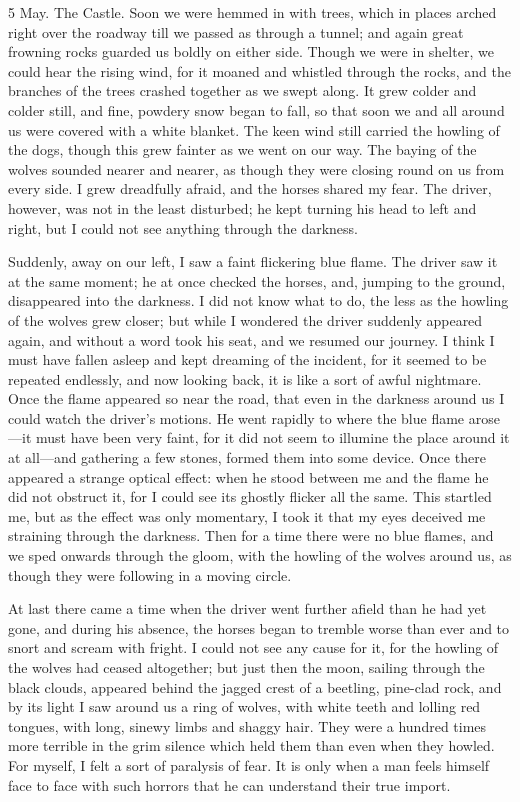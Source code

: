 \begin{diary}{5 May. The Castle.}
Soon we were hemmed in with trees, which in places arched right over the roadway till we passed as through a tunnel; and again great frowning rocks guarded us boldly on either side. Though we were in shelter, we could hear the rising wind, for it moaned and whistled through the rocks, and the branches of the trees crashed together as we swept along. It grew colder and colder still, and fine, powdery snow began to fall, so that soon we and all around us were covered with a white blanket. The keen wind still carried the howling of the dogs, though this grew fainter as we went on our way. The baying of the wolves sounded nearer and nearer, as though they were closing round on us from every side. I grew dreadfully afraid, and the horses shared my fear. The driver, however, was not in the least disturbed; he kept turning his head to left and right, but I could not see anything through the darkness.

Suddenly, away on our left, I saw a faint flickering blue flame. The driver saw it at the same moment; he at once checked the horses, and, jumping to the ground, disappeared into the darkness. I did not know what to do, the less as the howling of the wolves grew closer; but while I wondered the driver suddenly appeared again, and without a word took his seat, and we resumed our journey. I think I must have fallen asleep and kept dreaming of the incident, for it seemed to be repeated endlessly, and now looking back, it is like a sort of awful nightmare. Once the flame appeared so near the road, that even in the darkness around us I could watch the driver's motions. He went rapidly to where the blue flame arose—it must have been very faint, for it did not seem to illumine the place around it at all—and gathering a few stones, formed them into some device. Once there appeared a strange optical effect: when he stood between me and the flame he did not obstruct it, for I could see its ghostly flicker all the same. This startled me, but as the effect was only momentary, I took it that my eyes deceived me straining through the darkness. Then for a time there were no blue flames, and we sped onwards through the gloom, with the howling of the wolves around us, as though they were following in a moving circle.

At last there came a time when the driver went further afield than he had yet gone, and during his absence, the horses began to tremble worse than ever and to snort and scream with fright. I could not see any cause for it, for the howling of the wolves had ceased altogether; but just then the moon, sailing through the black clouds, appeared behind the jagged crest of a beetling, pine-clad rock, and by its light I saw around us a ring of wolves, with white teeth and lolling red tongues, with long, sinewy limbs and shaggy hair. They were a hundred times more terrible in the grim silence which held them than even when they howled. For myself, I felt a sort of paralysis of fear. It is only when a man feels himself face to face with such horrors that he can understand their true import.


\end{diary}
